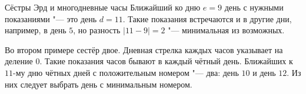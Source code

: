 \begin{problem}{Сёстры Эрд и многодневные часы}
Ближайший ко дню $e = 9$ день с нужными показаниями "--- это день $d = 11$.
Такие показания встречаются и в другие дни, например, в день $5$,
но разность $|11 - 9| = 2$ "--- минимальная из возможных.

Во втором примере сестёр двое.
Дневная стрелка каждых часов указывает на деление $0$.
Такие показания часов бывают в каждый чётный день.
Ближайших к $11$-му дню чётных дней с положительным номером "--- два:
день $10$ и день $12$.
Из них следует выбрать день с минимальным номером.

\end{problem}
